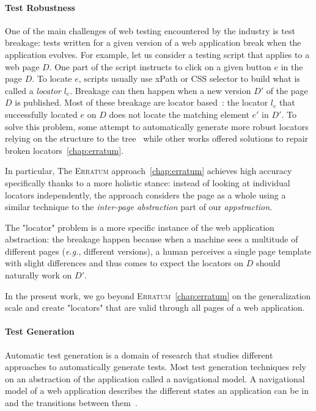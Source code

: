 \paragraph{Test Robustness}
One of the main challenges of web testing encountered by the industry is test breakage: tests written for a given version of a web application break when the application evolves.
For example, let us consider a testing script that applies to a web page $D$.
One part of the script instructs to click on a given button $e$ in the page $D$.
To locate $e$, scripts usually use xPath or CSS selector to build what is called a \emph{locator} $l_e$. 
Breakage can then happen when a new version $D'$ of the page $D$ is published.
Most of these breakage are locator based~\cite{Hammoudi2016WhyBreak}: the locator $l_e$ that successfully located $e$ on $D$ does not locate the matching element $e'$ in $D'$. 
To solve this problem, some attempt to automatically generate more robust locators relying on the structure to the tree~\cite{Leotta2016spanLocators, Leotta2021Sidereal:Testing, Yandrapally2014RobustClues, Bajaj2016SynthesizingLocators} while other works offered solutions to repair broken locators~\ref{chap:erratum}.

In particular, The \textsc{Erratum} approach~\ref{chap:erratum} achieves high accuracy specifically thanks to a more holistic stance: instead of looking at individual locators independently, the approach considers the page as a whole using a similar technique to the \emph{inter-page abstraction} part of our \emph{appstraction}.

The "locator" problem is a more specific instance of the web application abstraction: the breakage happen because when a machine sees a multitude of different pages (\emph{e.g.}, different versions), a human perceives a single page template with slight differences and thus comes to expect the locators on $D$ should naturally work on $D'$. 

In the present work, we go beyond \textsc{Erratum}~\ref{chap:erratum} on the generalization scale and create "locators" that are valid through all pages of a web application.

\paragraph{Test Generation}
Automatic test generation is a domain of research that studies different approaches to automatically generate tests. Most test generation techniques rely on an abstraction of the application called a navigational model. A navigational model of a web application describes the different states an application can be in and the transitions between them~\cite{mesbah2009invariant}.

